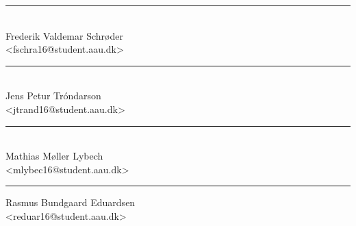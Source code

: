 \vfill\noindent
\begin{minipage}[b]{0.45\textwidth}
 \centering
 \rule{\textwidth}{0.8pt}\\
  Frederik Valdemar Schrøder\\
 {\footnotesize <fschra16@student.aau.dk>}
\end{minipage}
\hfill
\begin{minipage}[b]{0.45\textwidth}
 \centering
 \rule{\textwidth}{0.8pt}\\
  Jens Petur Tróndarson\\
 {\footnotesize <jtrand16@student.aau.dk>}
\end{minipage}
\vspace{3\baselineskip}

\vfill\noindent
\begin{minipage}[b]{0.45\textwidth}
 \centering
  \rule{\textwidth}{0.8pt}\\
  Mathias Møller Lybech\\
 {\footnotesize <mlybec16@student.aau.dk>}
\end{minipage}
\hfill
\begin{minipage}[b]{0.45\textwidth}
 \centering
 \rule{\textwidth}{0.8pt}
  Rasmus Bundgaard Eduardsen\\
 {\footnotesize <reduar16@student.aau.dk>}
\end{minipage}
